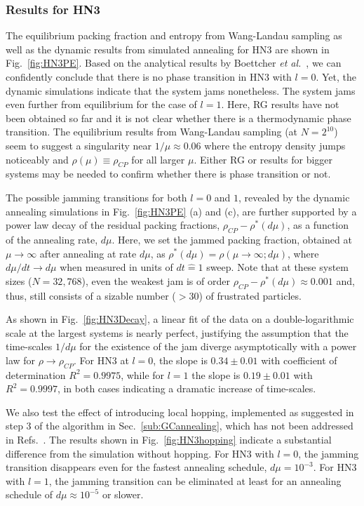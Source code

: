 \subsubsection{Results for HN3}

\label{subsec:HN3}

The equilibrium packing fraction and entropy from Wang-Landau sampling
as well as the dynamic results from simulated annealing for HN3 are
shown in Fig.~\ref{fig:HN3PE}. Based on the analytical results by
Boettcher \textit{et al.}~\cite{BoHa11}, we can confidently conclude
that there is no phase transition in HN3 with $l=0$. Yet, the dynamic
simulations indicate that the system jams nonetheless. The system
jams even further from equilibrium for the case of $l=1$. Here, RG
results have not been obtained so far and it is not clear whether
there is a thermodynamic phase transition. The equilibrium results
from Wang-Landau sampling (at $N=2^{10}$) seem to suggest a singularity
near $1/\mu\approx0.06$ where the entropy density jumps noticeably
and $\rho(\mu)\equiv\rho_{CP}$ for all larger $\mu$. Either RG or
results for bigger systems may be needed to confirm whether there
is phase transition or not. 

The possible jamming transitions for both $l=0$ and $1$, revealed
by the dynamic annealing simulations in Fig.~\ref{fig:HN3PE} (a)
and (c), are further supported by a power law decay of the residual
packing fractions, $\rho_{CP}-\rho^{*}(d\mu)$, as a function of the
annealing rate, $d\mu$. Here, we set the jammed packing fraction,
obtained at $\mu\to\infty$ after annealing at rate $d\mu$, as $\rho^{*}(d\mu)=\rho(\mu\to\infty;d\mu)$,
where $d\mu/dt\to d\mu$ when measured in units of $dt\hat{=}1$ sweep.
Note that at these system sizes ($N=32,768$), even the weakest jam
is of order $\rho_{CP}-\rho^{*}(d\mu)\approx0.001$ and, thus, still
consists of a sizable number ($ > 30$) of frustrated particles. 

As shown in Fig.~\ref{fig:HN3Decay}, a linear fit of the data on
a double-logarithmic scale at the largest systems  is
nearly perfect, justifying the assumption that the time-scales $1/d\mu$
for the existence of the jam diverge asymptotically with a power law
for $\rho\to\rho_{CP}$. For HN3 at $l=0$, the slope is $0.34\pm0.01$
with coefficient of determination $R^{2}=0.9975$, while for $l=1$
the slope is $0.19\pm0.01$ with $R^{2}=0.9997$, in both cases indicating
a dramatic increase of time-scales. 

We also test the effect of introducing local hopping, implemented
as suggested in step 3 of the algorithm in Sec.~\ref{sub:GCannealing},
which has not been addressed in Refs.~\cite{Krzakala2008, Biroli02}.
The results shown in Fig.~\ref{fig:HN3hopping} indicate a substantial
difference from the simulation without hopping. For HN3 with $l=0$,
the jamming transition disappears even for the fastest annealing schedule,
$d\mu=10^{-3}$. For HN3 with $l=1$, the jamming transition can be
eliminated at least for an annealing schedule of $d\mu\approx10^{-5}$
or slower. 

